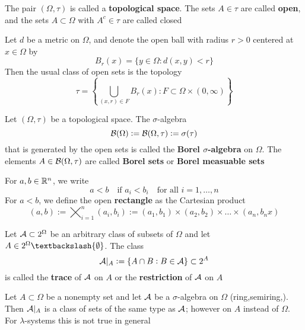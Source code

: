 \documentclass[11pt]{article}
\begin{document}
The pair \((\Omega,\tau)\) is called a \textbf{topological space}. The sets \(A\in\tau\) are
called \textbf{open}, and the sets \(A\subset\Omega\) with \(A^c\in\tau\) are called closed

Let \(d\) be a metric on \(\Omega\), and denote the open ball with radius \(r>0\)
centered at \(x\in\Omega\) by
\begin{equation*}
 B_r(x)=\{y\in\Omega:d(x,y)<r\}
\end{equation*}
Then the usual class of open sets is the topology
\begin{equation*}
\tau=\left\{\displaystyle\bigcup_{(x,r)\in F}B_r(x):F\subset\Omega
\times(0,\infty)\right\}
\end{equation*}



\begin{definition}
Let \((\Omega,\tau)\) be a topological space. The \(\sigma\)-algebra 
\begin{equation*}
\mathcal{B}(\Omega):=\mathcal{B}(\Omega,\tau):=\sigma(\tau)
\end{equation*}
that is generated by the open sets is called the \textbf{Borel \(\sigma\)-algebra} on
\(\Omega\). The elements \(A\in\mathcal{B}(\Omega,\tau)\) are called \textbf{Borel sets} or \textbf{Borel measuable sets}
\end{definition}




For \(a,b\in\mathbb{R}^n\), we write 
\begin{equation*}
a<b\quad\text{if }a_i<b_i\quad\text{for all }i=1,\dots,n
\end{equation*}
For \(a<b\), we define the open \textbf{rectangle} as the Cartesian product
\begin{equation*}
(a,b):=\bigtimes_{i=1}^n(a_i,b_i):=(a_1,b_1)\times(a_2,b_2)\times\dots\times
(a_n,b_nx)
\end{equation*}

\begin{definition}
Let \(\mathcal{A}\subset2^\Omega\) be an arbitrary class of subsets of \(\Omega\) and let 
\(A\in2^\Omega\textbackslash\{\emptyset\}\). The class 
\begin{equation*}
\mathcal{A}|_A:=\{A\cap B:B\in\mathcal{A}\}\subset2^A
\end{equation*}
is called the \textbf{trace} of \(\mathcal{A}\) on \(A\) or the \textbf{restriction} of \(\mathcal{A}\) on \(A\)
\end{definition}

\begin{theorem}[]
Let \(A\subset\Omega\) be a nonempty set and let \(\mathcal{A}\) be a
\(\sigma\)-algebra on \(\Omega\) (ring,semiring,). Then \(\mathcal{A}|_A\)
is a class of sets of the same type as \(\mathcal{A}\); however on \(A\) instead of \(\Omega\).
For \(\lambda\)-systems this is not true in general
\end{theorem}
\end{document}
